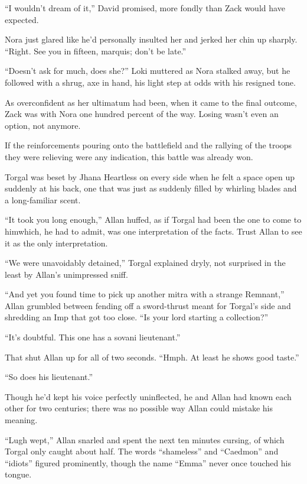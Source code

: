 ``I wouldn't dream of it,'' David promised, more fondly than Zack would have expected.

Nora just glared like he'd personally insulted her and jerked her chin up sharply. ``Right. See you in fifteen, marquis; don't be late.''

``Doesn't ask for much, does she?'' Loki muttered as Nora stalked away, but he followed with a shrug, axe in hand, his light step at odds with his resigned tone.

As overconfident as her ultimatum had been, when it came to the final outcome, Zack was with Nora one hundred percent of the way. Losing wasn't even an option, not anymore.

If the reinforcements pouring onto the battlefield and the rallying of the troops they were relieving were any indication, this battle was already won.


\scenechange


Torgal was beset by Jhana Heartless on every side when he felt a space open up suddenly at his back, one that was just as suddenly filled by whirling blades and a long-familiar scent.

``It took you long enough,'' Allan huffed, as if Torgal had been the one to come to him\textemdash which, he had to admit, was one interpretation of the facts. Trust Allan to see it as the only interpretation.

``We were unavoidably detained,'' Torgal explained dryly, not surprised in the least by Allan's unimpressed sniff.

``And yet you found time to pick up another mitra with a strange Remnant,'' Allan grumbled between fending off a sword-thrust meant for Torgal's side and shredding an Imp that got too close. ``Is your lord starting a collection?''

``It's doubtful. This one has a sovani lieutenant.''

That shut Allan up for all of two seconds. ``Hmph. At least he shows good taste.''

``So does his lieutenant.''

Though he'd kept his voice perfectly uninflected, he and Allan had known each other for two centuries; there was no possible way Allan could mistake his meaning.

``Lugh wept,'' Allan snarled and spent the next ten minutes cursing, of which Torgal only caught about half. The words ``shameless'' and ``Caedmon'' and ``idiots'' figured prominently, though the name ``Emma'' never once touched his tongue.

